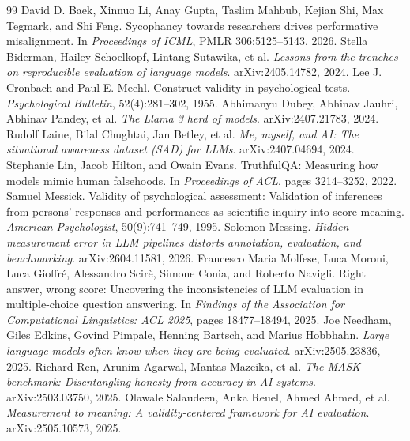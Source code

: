 \documentclass[10pt]{article}
\begin{document}
\begin{thebibliography}{99}
 David D. Baek, Xinnuo Li, Anay Gupta, Taslim Mahbub, Kejian Shi, Max Tegmark, and Shi Feng. Sycophancy towards researchers drives performative misalignment. In \emph{Proceedings of ICML}, PMLR 306:5125--5143, 2026.
 Stella Biderman, Hailey Schoelkopf, Lintang Sutawika, et al. \emph{Lessons from the trenches on reproducible evaluation of language models}. arXiv:2405.14782, 2024.
 Lee J. Cronbach and Paul E. Meehl. Construct validity in psychological tests. \emph{Psychological Bulletin}, 52(4):281--302, 1955.
 Abhimanyu Dubey, Abhinav Jauhri, Abhinav Pandey, et al. \emph{The Llama 3 herd of models}. arXiv:2407.21783, 2024.
 Rudolf Laine, Bilal Chughtai, Jan Betley, et al. \emph{Me, myself, and AI: The situational awareness dataset (SAD) for LLMs}. arXiv:2407.04694, 2024.
 Stephanie Lin, Jacob Hilton, and Owain Evans. TruthfulQA: Measuring how models mimic human falsehoods. In \emph{Proceedings of ACL}, pages 3214--3252, 2022.
 Samuel Messick. Validity of psychological assessment: Validation of inferences from persons' responses and performances as scientific inquiry into score meaning. \emph{American Psychologist}, 50(9):741--749, 1995.
 Solomon Messing. \emph{Hidden measurement error in LLM pipelines distorts annotation, evaluation, and benchmarking}. arXiv:2604.11581, 2026.
 Francesco Maria Molfese, Luca Moroni, Luca Gioffr\'e, Alessandro Scir\`e, Simone Conia, and Roberto Navigli. Right answer, wrong score: Uncovering the inconsistencies of LLM evaluation in multiple-choice question answering. In \emph{Findings of the Association for Computational Linguistics: ACL 2025}, pages 18477--18494, 2025.
 Joe Needham, Giles Edkins, Govind Pimpale, Henning Bartsch, and Marius Hobbhahn. \emph{Large language models often know when they are being evaluated}. arXiv:2505.23836, 2025.
 Richard Ren, Arunim Agarwal, Mantas Mazeika, et al. \emph{The MASK benchmark: Disentangling honesty from accuracy in AI systems}. arXiv:2503.03750, 2025.
 Olawale Salaudeen, Anka Reuel, Ahmed Ahmed, et al. \emph{Measurement to meaning: A validity-centered framework for AI evaluation}. arXiv:2505.10573, 2025.

\end{thebibliography}
\end{document}

